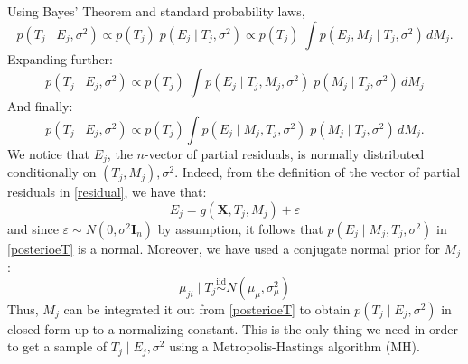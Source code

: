 \documentclass[a4paper,11pt]{article}
\begin{document}
Using Bayes' Theorem and standard probability laws, 
\[
p(T_j \mid E_j, \sigma^2) \propto p(T_j) \; p(E_j \mid T_j, \sigma^2) 
\propto p(T_j) \; \int p(E_j, M_j \mid T_j, \sigma^2) \, dM_j.
\]
Expanding further:
\[
p(T_j \mid E_j, \sigma^2) \propto p(T_j) \; \int p(E_j \mid T_j, M_j, \sigma^2) \; p(M_j \mid T_j, \sigma^2) \, dM_j
\]
And finally:
\begin{equation}
p(T_j \mid E_j, \sigma^2) \propto p(T_j) \int p(E_j \mid M_j, T_j, \sigma^2) \; p(M_j \mid T_j, \sigma^2) \, dM_j. \label{posterioeT}
\end{equation}
We notice that $E_j$, the $n$-vector of partial residuals, is normally distributed conditionally on $(T_j, M_j), \sigma^2$. Indeed, from the definition of the vector of partial residuals in \eqref{residual}, we have that:
\[
E_j = g(\mathbf{X}, T_j, M_j) + \varepsilon
\]
and since $\varepsilon \sim N(0, \sigma^2 \mathbf{I}_n)$ by assumption, it follows that $p(E_j \mid M_j, T_j, \sigma^2) $ in \eqref{posterioeT} is a normal. Moreover, we have used a conjugate normal prior for $M_j$:
\[ \mu_{ji} \mid T_j  \overset{\text{iid}}{\sim} N(\mu_\mu, \sigma_\mu^2)
\]
Thus, $M_j$ can be integrated it out from \eqref{posterioeT} to obtain $p(T_j \mid E_j, \sigma^2)$ in closed form up to a normalizing constant. This is the only thing we need in order to get a sample of $T_j \mid E_j, \sigma^2$ using a Metropolis-Hastings algorithm (MH). 
\end{document}
